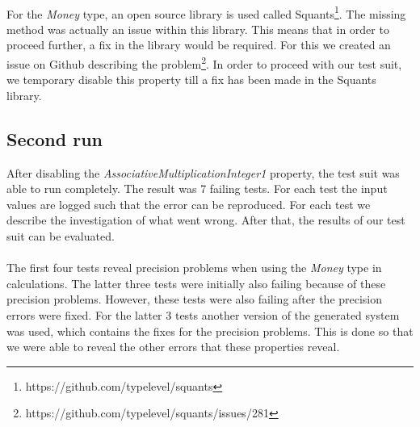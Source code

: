 \\
For the \textit{Money} type, an open source library is used called Squants\footnote{https://github.com/typelevel/squants}. The missing method was actually an issue within this library. This means that in order to proceed further, a fix in the library would be required. For this we created an issue on Github describing the problem\footnote{https://github.com/typelevel/squants/issues/281}. In order to proceed with our test suit, we temporary disable this property till a fix has been made in the Squants library.

\subsection{Second run}
After disabling the \textit{AssociativeMultiplicationInteger1} property, the test suit was able to run completely. The result was 7 failing tests. For each test the input values are logged such that the error can be reproduced. For each test we describe the investigation of what went wrong. After that, the results of our test suit can be evaluated.\\
\\
The first four tests reveal precision problems when using the \textit{Money} type in calculations. The latter three tests were initially also failing because of these precision problems. However, these tests were also failing after the precision errors were fixed. For the latter 3 tests another version of the generated system was used, which contains the fixes for the precision problems. This is done so that we were able to reveal the other errors that these properties reveal.

